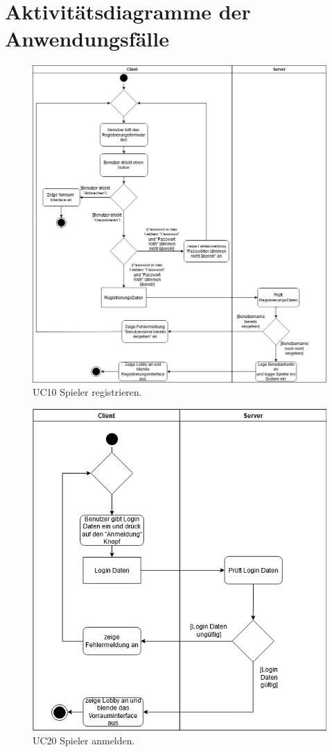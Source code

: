 \chapter{Aktivitätsdiagramme der Anwendungsfälle}

\begin{figure}[h]
	\centering
	\includegraphics[width=\textwidth]{ad/UC10_Registrierung.png}
	\caption{UC10 Spieler registrieren.}
\end{figure}

\begin{figure}[h]
	\centering
	\includegraphics[width=\textwidth]{ad/UC20_Anmeldung.png}
	\caption{UC20 Spieler anmelden.}
\end{figure}

